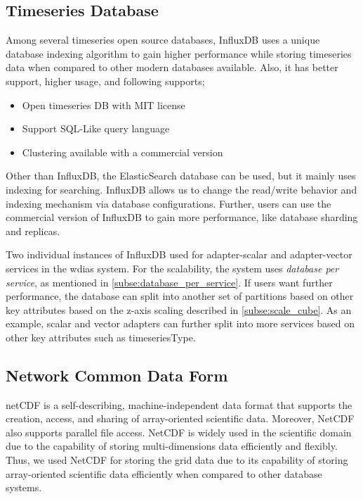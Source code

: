 \subsection{Timeseries Database}
\label{subse:influxdb}

Among several timeseries open source databases, InfluxDB \cite{influxdbInfluxDBDocumentation} uses a unique database indexing algorithm to gain higher performance while storing timeseries data when compared to other modern databases available. Also, it has better support, higher usage, and following supports;

\begin{itemize}
  \item Open timeseries DB with MIT license
  \item Support SQL-Like query language
  \item Clustering available with a commercial version
\end{itemize}

Other than InfluxDB, the ElasticSearch database can be used, but it mainly uses indexing for searching. InfluxDB allows us to change the read/write behavior and indexing mechanism via database configurations. Further, users can use the commercial version of InfluxDB to gain more performance, like database sharding and replicas.

Two individual instances of InfluxDB used for adapter-scalar and adapter-vector services in the \acrshort{wdias} system. For the scalability, the system uses \emph{database per service}, as mentioned in \cref{subse:database_per_service}. If users want further performance, the database can split into another set of partitions based on other key attributes based on the z-axis scaling described in \cref{subse:scale_cube}. As an example, scalar and vector adapters can further split into more services based on other key attributes such as timeseriesType.

\subsection{Network Common Data Form}
\label{subse:netcdf}

\acrshort{netCDF} \cite{unidataUnidataNetCDF} is a self-describing, machine-independent data format that supports the creation, access, and sharing of array-oriented scientific data. Moreover, NetCDF also supports parallel file access. NetCDF is widely used in the scientific domain due to the capability of storing multi-dimensions data efficiently and flexibly. Thus, we used NetCDF for storing the grid data due to its capability of storing array-oriented scientific data efficiently when compared to other database systems.

